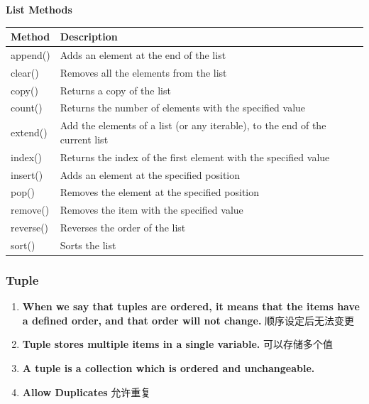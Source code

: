 \documentclass[UTF8]{article}
\begin{document}
\textbf{List Methods}
\begin{table}
    \begin{tabular}{ll}
        \hline
        \textbf{Method} & \textbf{Description}                                                         \\ \hline
        append()        & Adds an element at the end of the list                                       \\ \hline
        clear()         & Removes all the elements from the list                                       \\ \hline
        copy()          & Returns a copy of the list                                                   \\ \hline
        count()         & Returns the number of elements with the specified value                      \\ \hline
        extend()        & Add the elements of a list (or any iterable), to the end of the current list \\ \hline
        index()         & Returns the index of the first element with the specified value              \\ \hline
        insert()        & Adds an element at the specified position                                    \\ \hline
        pop()           & Removes the element at the specified position                                \\ \hline
        remove()        & Removes the item with the specified value                                    \\ \hline
        reverse()       & Reverses the order of the list                                               \\ \hline
        sort()          & Sorts the list                                                               \\  \hline
    \end{tabular}
\end{table}



\subsubsection{Tuple}
\begin{enumerate}
    \item \textbf{When we say that tuples are ordered, it means that the items have a defined order, and that order will not change.} 顺序设定后无法变更
    \item \textbf{Tuple stores multiple items in a single variable.} 可以存储多个值
    \item \textbf{A tuple is a collection which is ordered and unchangeable.}
    \item \textbf{Allow Duplicates} 允许重复
\end{enumerate}
\end{document}
